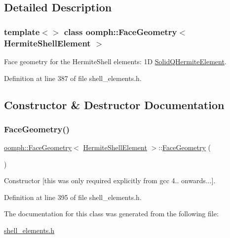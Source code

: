 \subsection{Detailed Description}
\subsubsection*{template$<$$>$\newline
class oomph\+::\+Face\+Geometry$<$ Hermite\+Shell\+Element $>$}

Face geometry for the Hermite\+Shell elements\+: 1D \hyperlink{classoomph_1_1SolidQHermiteElement}{Solid\+Q\+Hermite\+Element}. 

Definition at line 387 of file shell\+\_\+elements.\+h.



\subsection{Constructor \& Destructor Documentation}
\mbox{\label{classoomph_1_1FaceGeometry_3_01HermiteShellElement_01_4_a0ec8a60363ca4b27ab57f6ae6847046c}} 
\subsubsection{\texorpdfstring{Face\+Geometry()}{FaceGeometry()}}
{\footnotesize\ttfamily \hyperlink{classoomph_1_1FaceGeometry}{oomph\+::\+Face\+Geometry}$<$ \hyperlink{classoomph_1_1HermiteShellElement}{Hermite\+Shell\+Element} $>$\+::\hyperlink{classoomph_1_1FaceGeometry}{Face\+Geometry} (\begin{DoxyParamCaption}{ }\end{DoxyParamCaption})\hspace{0.3cm}{\ttfamily [inline]}}



Constructor \mbox{[}this was only required explicitly from gcc 4.. onwards...\mbox{]}. 



Definition at line 395 of file shell\+\_\+elements.\+h.



The documentation for this class was generated from the following file\+:\begin{DoxyCompactItemize}
\item 
\hyperlink{shell__elements_8h}{shell\+\_\+elements.\+h}\end{DoxyCompactItemize}
